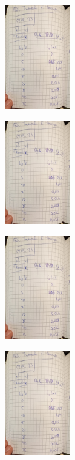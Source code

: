 \begin{minipage}[t]{0.4\textwidth}
   \includegraphics[height=4.5cm, page=1]{Abbildungen/v504_messdaten.pdf}
\end{minipage}
\begin{minipage}[t]{0.4\textwidth}
   \includegraphics[height=4.5cm, keepaspectratio, page=2]{Abbildungen/v504_messdaten.pdf}
\end{minipage}
\begin{minipage}[t]{0.4\textwidth}
   \includegraphics[height=4.5cm, page=3]{Abbildungen/v504_messdaten.pdf}
\end{minipage}
\begin{minipage}[t]{0.4\textwidth}
   \includegraphics[height=4.5cm, keepaspectratio, page=4]{Abbildungen/v504_messdaten.pdf}
\end{minipage}
